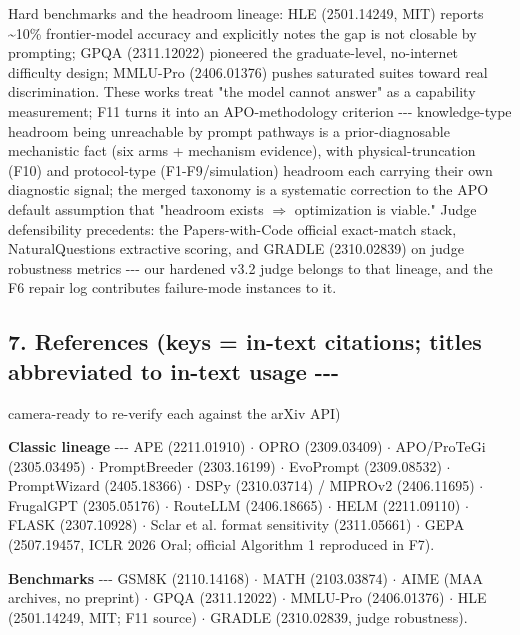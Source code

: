 Hard benchmarks and the headroom lineage: HLE (2501.14249, MIT) reports \textasciitilde10\% frontier-model accuracy and explicitly notes the gap is not closable by prompting; GPQA (2311.12022) pioneered the graduate-level, no-internet difficulty design; MMLU-Pro (2406.01376) pushes saturated suites toward real discrimination. These works treat "the model cannot answer" as a capability measurement; F11 turns it into an APO-methodology criterion -\/-\/- knowledge-type headroom being unreachable by prompt pathways is a prior-diagnosable mechanistic fact (six arms + mechanism evidence), with physical-truncation (F10) and protocol-type (F1-F9/simulation) headroom each carrying their own diagnostic signal; the merged taxonomy is a systematic correction to the APO default assumption that "headroom exists \(\Rightarrow\) optimization is viable." Judge defensibility precedents: the Papers-with-Code official exact-match stack, NaturalQuestions extractive scoring, and GRADLE (2310.02839) on judge robustness metrics -\/-\/- our hardened v3.2 judge belongs to that lineage, and the F6 repair log contributes failure-mode instances to it.

\subsection{7. References (keys = in-text citations; titles abbreviated to in-text usage -\/-\/-}\label{7-references-keys--in-text-citations-titles-abbreviated-to-in-text-usage----}

camera-ready to re-verify each against the arXiv API)

\textbf{Classic lineage} -\/-\/- APE (2211.01910) \(\cdot\) OPRO (2309.03409) \(\cdot\) APO/ProTeGi (2305.03495) \(\cdot\) PromptBreeder (2303.16199) \(\cdot\) EvoPrompt (2309.08532) \(\cdot\) PromptWizard (2405.18366) \(\cdot\) DSPy (2310.03714) / MIPROv2 (2406.11695) \(\cdot\) FrugalGPT (2305.05176) \(\cdot\) RouteLLM (2406.18665) \(\cdot\) HELM (2211.09110) \(\cdot\) FLASK (2307.10928) \(\cdot\) Sclar et al. format sensitivity (2311.05661) \(\cdot\) GEPA (2507.19457, ICLR 2026 Oral; official Algorithm 1 reproduced in F7).

\textbf{Benchmarks} -\/-\/- GSM8K (2110.14168) \(\cdot\) MATH (2103.03874) \(\cdot\) AIME (MAA archives, no preprint) \(\cdot\) GPQA (2311.12022) \(\cdot\) MMLU-Pro (2406.01376) \(\cdot\) HLE (2501.14249, MIT; F11 source) \(\cdot\) GRADLE (2310.02839, judge robustness).

